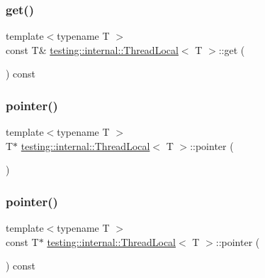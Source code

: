 \subsubsection{\texorpdfstring{get()}{get()}}
{\footnotesize\ttfamily template$<$typename T $>$ \\
const T\& \mbox{\hyperlink{classtesting_1_1internal_1_1_thread_local}{testing\+::internal\+::\+Thread\+Local}}$<$ T $>$\+::get (\begin{DoxyParamCaption}{ }\end{DoxyParamCaption}) const\hspace{0.3cm}{\ttfamily [inline]}}

\mbox{\label{classtesting_1_1internal_1_1_thread_local_a882f57fed4b074de83693c0c0fe62858}} 
\subsubsection{\texorpdfstring{pointer()}{pointer()}\hspace{0.1cm}{\footnotesize\ttfamily [1/2]}}
{\footnotesize\ttfamily template$<$typename T $>$ \\
T$\ast$ \mbox{\hyperlink{classtesting_1_1internal_1_1_thread_local}{testing\+::internal\+::\+Thread\+Local}}$<$ T $>$\+::pointer (\begin{DoxyParamCaption}{ }\end{DoxyParamCaption})\hspace{0.3cm}{\ttfamily [inline]}}

\mbox{\label{classtesting_1_1internal_1_1_thread_local_a57e45bb60e3cd94abb04fa449e9f0367}} 
\subsubsection{\texorpdfstring{pointer()}{pointer()}\hspace{0.1cm}{\footnotesize\ttfamily [2/2]}}
{\footnotesize\ttfamily template$<$typename T $>$ \\
const T$\ast$ \mbox{\hyperlink{classtesting_1_1internal_1_1_thread_local}{testing\+::internal\+::\+Thread\+Local}}$<$ T $>$\+::pointer (\begin{DoxyParamCaption}{ }\end{DoxyParamCaption}) const\hspace{0.3cm}{\ttfamily [inline]}}


